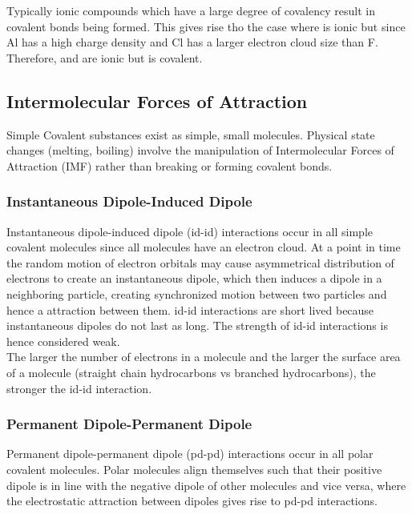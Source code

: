\documentclass[../main]{subfiles}
\begin{document}
	Typically ionic compounds which have a large degree of covalency result in covalent bonds being formed. This gives rise tho the case where  is ionic but  since Al has a high charge density and Cl has a larger electron cloud size than F. Therefore,  and  are ionic but  is covalent.

	\subsection{Intermolecular Forces of Attraction}

	Simple Covalent substances exist as simple, small molecules. Physical state changes (melting, boiling) involve the manipulation of Intermolecular Forces of Attraction (IMF) rather than breaking or forming covalent bonds.

	\subsubsection{Instantaneous Dipole-Induced Dipole}

	Instantaneous dipole-induced dipole (id-id) interactions occur in all simple covalent molecules since all molecules have an electron cloud. At a point in time the random motion of electron orbitals may cause asymmetrical distribution of electrons to create an instantaneous dipole, which then induces a dipole in a neighboring particle, creating synchronized motion between two particles and hence a attraction between them. id-id interactions are short lived because instantaneous dipoles do not last as long. The strength of id-id interactions is hence considered weak. \\

	The larger the number of electrons in a molecule and the larger the surface area of a molecule (straight chain hydrocarbons vs branched hydrocarbons), the stronger the id-id interaction. \\

	\subsubsection{Permanent Dipole-Permanent Dipole}

	Permanent dipole-permanent dipole (pd-pd) interactions occur in all polar covalent molecules. Polar molecules align themselves such that their positive dipole is in line with the negative dipole of other molecules and vice versa, where the electrostatic attraction between dipoles gives rise to pd-pd interactions. \\
\end{document}
